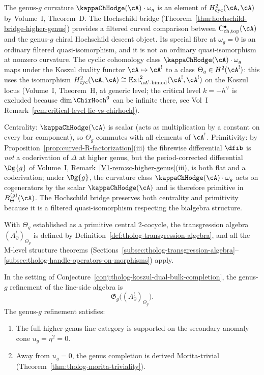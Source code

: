 \begin{remark}
The genus-\(g\) curvature \(\kappaChHodge(\cA) \cdot \omega_g\) is an
element of \(H^2_{\mathrm{cyc}}(\cA, \cA)\) by Volume~I,
Theorem~D. The Hochschild bridge
(Theorem~\ref{thm:hochschild-bridge-higher-genus}) provides a
filtered curved comparison between
\(\mathrm{C}^\bullet_{\mathrm{ch,top}}(\cA)\) and the genus-\(g\)
chiral Hochschild descent object.  Its special fibre at
\(\omega_g=0\) is an ordinary filtered quasi-isomorphism, and it is
not an ordinary quasi-isomorphism at nonzero curvature.  The cyclic
cohomology class \(\kappaChHodge(\cA) \cdot \omega_g\) maps under the
Koszul duality functor \(\cA \mapsto \cA^!\) to a class
\(\Theta_g \in H^2(\cA^!)\): this uses the isomorphism
\(H^2_{\mathrm{cyc}}(\cA, \cA) \cong
\mathrm{Ext}^2_{\cA^!\text{-}\mathrm{bimod}}(\cA^!, \cA^!)\)
on the Koszul locus (Volume~I, Theorem~H, at generic level; the critical
level $k = -h^\vee$ is excluded because $\dim \ChirHoch^0$ can be infinite
there, see Vol~I Remark~\ref*{rem:critical-level-lie-vs-chirhoch}).

Centrality: \(\kappaChHodge(\cA)\) is scalar (acts as multiplication by a
constant on every bar component), so \(\Theta_g\) commutes with
all elements of \(\cA^!\). Primitivity: by
Proposition~\ref{prop:curved-R-factorization}\textup{(iii)} the
fibrewise differential \(\dfib\) is \emph{not} a coderivation of
\(\Delta\) at higher genus, but the period-corrected
differential \(\Dg{g}\) of Volume~I,
Remark~\ref{V1-rem:sc-higher-genus}\textup{(iii)}, is both flat
and a coderivation; under \(\Dg{g}\), the curvature class
\(\kappaChHodge(\cA)\cdot\omega_g\) acts on cogenerators by the scalar
\(\kappaChHodge(\cA)\) and is therefore primitive in
\(B_\Theta^{(g)}(\cA)\). The Hochschild bridge preserves both
centrality and primitivity because it is a filtered
quasi-isomorphism respecting the bialgebra structure.

With \(\Theta_g\) established as a primitive central \(2\)-cocycle,
the transgression algebra \((A_{\partial}^{!})_{\Theta_g}\) is
defined by Definition~\ref{def:tholog-transgression-algebra}, and
all the M-level structure theorems
(Sections~\ref{subsec:tholog-transgression-algebra}--\ref{subsec:tholog-handle-operators-on-morphisms})
apply.
\end{remark}

\begin{conjecture}
In the setting of Conjecture~\ref{conj:tholog-koszul-dual-bulk-completion},
the genus-\(g\) refinement of the line-side algebra is
\[
\mathfrak{G}_{g}\!\big((A_{\partial}^{!})_{\Theta_{g}}\big).
\]
The genus-$g$ refinement satisfies:
\begin{enumerate}[label=\textup{(\roman*)}]
\item The full higher-genus line category is supported on the
 secondary-anomaly cone \(u_{g} = \eta^2 = 0\).
\item Away from \(u_g = 0\), the genus completion is derived
 Morita-trivial
 (Theorem~\textup{\ref{thm:tholog-morita-triviality}}).
\end{enumerate}
\end{conjecture}

